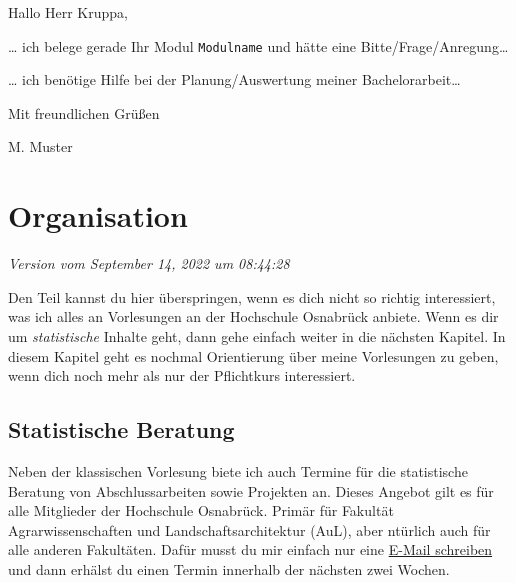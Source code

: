 \documentclass[
  letterpaper,
]{scrbook}
\begin{document}
\begin{tcolorbox}[enhanced jigsaw, coltitle=black, titlerule=0mm, bottomrule=.15mm, opacityback=0, opacitybacktitle=0.6, leftrule=.75mm, title=\textcolor{quarto-callout-tip-color}{\faLightbulb}\hspace{0.5em}{E-Mailvorlage mit beispielhafter Anrede}, toprule=.15mm, bottomtitle=1mm, toptitle=1mm, left=2mm, breakable, arc=.35mm, colback=white, rightrule=.15mm, colbacktitle=quarto-callout-tip-color!10!white, colframe=quarto-callout-tip-color-frame]
Hallo Herr Kruppa,

\ldots{} ich belege gerade Ihr Modul \texttt{Modulname} und hätte eine
Bitte/Frage/Anregung\ldots{}

\ldots{} ich benötige Hilfe bei der Planung/Auswertung meiner
Bachelorarbeit\ldots{}

Mit freundlichen Grüßen

M. Muster
\end{tcolorbox}


\hypertarget{organisation}{%
\chapter{Organisation}\label{organisation}}

\emph{Version vom September 14, 2022 um 08:44:28}

Den Teil kannst du hier überspringen, wenn es dich nicht so richtig
interessiert, was ich alles an Vorlesungen an der Hochschule Osnabrück
anbiete. Wenn es dir um \emph{statistische} Inhalte geht, dann gehe
einfach weiter in die nächsten Kapitel. In diesem Kapitel geht es
nochmal Orientierung über meine Vorlesungen zu geben, wenn dich noch
mehr als nur der Pflichtkurs interessiert.

\hypertarget{statistische-beratung}{%
\section{Statistische Beratung}\label{statistische-beratung}}

Neben der klassischen Vorlesung biete ich auch Termine für die
statistische Beratung von Abschlussarbeiten sowie Projekten an. Dieses
Angebot gilt es für alle Mitglieder der Hochschule Osnabrück. Primär für
Fakultät Agrarwissenschaften und Landschaftsarchitektur (AuL), aber
ntürlich auch für alle anderen Fakultäten. Dafür musst du mir einfach
nur eine \protect\hyperlink{sec-contact-mail}{E-Mail schreiben} und dann
erhälst du einen Termin innerhalb der nächsten zwei Wochen.
\end{document}
